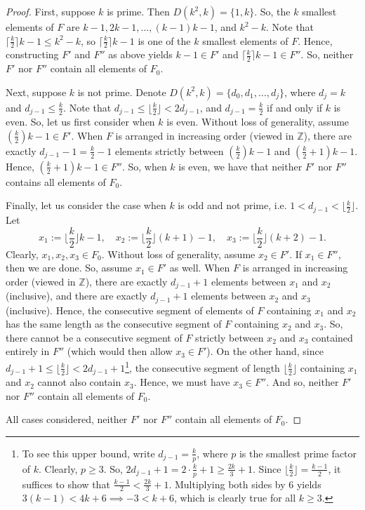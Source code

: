 \documentclass{article}
\theoremstyle{definition}
\theoremstyle{remark}
\begin{document}
\begin{proof}
    First, suppose $k$ is prime. Then $D(k^2,k) = \{1,k\}$. So, the $k$ smallest elements of $F$ are $k-1,2k-1,\ldots,(k-1)k-1$, and $k^2-k$. Note that $\lceil\frac{k}{2}\rceil k - 1 \leq k^2-k$, so $\lceil\frac{k}{2}\rceil k-1$ is one of the $k$ smallest elements of $F$. Hence, constructing $F'$ and $F''$ as above yields $k-1 \in F'$ and $\lceil\frac{k}{2}\rceil k-1 \in F''$. So, neither $F'$ nor $F''$ contain all elements of $F_{0}$.

    Next, suppose $k$ is not prime. Denote $D(k^2,k) = \{d_0,d_1,\ldots,d_{j}\}$, where $d_{j} = k$ and $d_{j-1} \leq \frac{k}{2}$. Note that $d_{j-1} \leq \lfloor\frac{k}{2}\rfloor < 2d_{j-1}$, and $d_{j-1} = \frac{k}{2}$ if and only if $k$ is even. So, let us first consider when $k$ is even. Without loss of generality, assume $(\frac{k}{2})k-1 \in F'$. When $F$ is arranged in increasing order (viewed in $\mathbb{Z}$), there are exactly $d_{j-1}-1 = \frac{k}{2}-1$ elements strictly between $(\frac{k}{2})k-1$ and $(\frac{k}{2}+1)k-1$. Hence, $(\frac{k}{2}+1)k-1 \in F''$. So, when $k$ is even, we have that neither $F'$ nor $F''$ contains all elements of $F_0$.

    Finally, let us consider the case when $k$ is odd and not prime, i.e. $1<d_{j-1} < \lfloor\frac{k}{2}\rfloor$. Let \begin{equation*}
        x_1 := \lfloor\frac{k}{2}\rfloor k-1,  \quad x_2 := \lfloor\frac{k}{2}\rfloor(k+1)-1, \quad x_3 := \lfloor\frac{k}{2}\rfloor(k+2)-1.
    \end{equation*} Clearly, $x_1,x_2,x_3 \in F_0$. Without loss of generality, assume $x_2 \in F'$. If $x_1 \in F''$, then we are done. So, assume $x_1 \in F'$ as well. When $F$ is arranged in increasing order (viewed in $\mathbb{Z}$), there are exactly $d_{j-1}+1$ elements between $x_1$ and $x_2$ (inclusive), and there are exactly $d_{j-1}+1$ elements between $x_{2}$ and $x_3$ (inclusive). Hence, the consecutive segment of elements of $F$ containing $x_1$ and $x_2$ has the same length as the consecutive segment of $F$ containing $x_2$ and $x_3$. So, there cannot be a consecutive segment of $F$ strictly between $x_2$ and $x_3$ contained entirely in $F''$ (which would then allow $x_3 \in F'$). On the other hand, since $d_{j-1}+1 \leq \lfloor\frac{k}{2}\rfloor < 2d_{j-1}+1$\footnote{To see this upper bound, write $d_{j-1} = \frac{k}{p}$, where $p$ is the smallest prime factor of $k$. Clearly, $p \geq 3$. So, $2d_{j-1}+1 = 2\cdot \frac{k}{p}+1 \geq \frac{2k}{3}+1$. Since $\lfloor\frac{k}{2}\rfloor = \frac{k-1}{2}$, it suffices to show that $\frac{k-1}{2} < \frac{2k}{3} + 1$. Multiplying both sides by $6$ yields $3(k-1) < 4k+6 \implies -3 < k+6$, which is clearly true for all $k \geq 3$. }, the consecutive segment of length $\lfloor\frac{k}{2}\rfloor$ containing $x_1$ and $x_2$ cannot also contain $x_3$. Hence, we must have $x_3 \in F''$. And so, neither $F'$ nor $F''$ contain all elements of $F_0$.
    
    All cases considered, neither $F'$ nor $F''$ contain all elements of $F_0$.
\end{proof}
\end{document}
